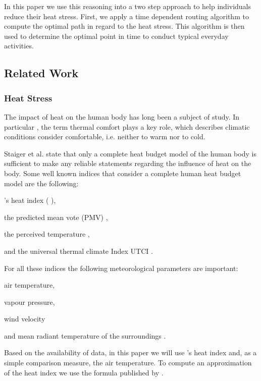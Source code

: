 In this paper we use this reasoning into a two step approach to help individuals reduce their heat stress. First, we apply a time dependent routing algorithm to compute the optimal path in regard to the heat stress. This algorithm is then used to determine the optimal point in time to conduct typical everyday activities. 



   
\subsection{Related Work} 

\subsubsection{Heat Stress}
The impact of heat on the human body has long been a subject of study. In particular , the term thermal comfort plays a key role, which describes climatic conditions consider comfortable, i.e. neither to warm nor to cold. 

Staiger et al. \parencite{Staiger1997} state that only a complete heat budget model of the human body is sufficient to make any reliable statements regarding the influence of heat on the body. Some well known indices that consider a complete human heat budget model are the following:
\begin{inparaenum}[(1)]
  \item \citeauthor{Steadman1979}'s heat index (\citeauthor{Steadman1979} \citeyear*{Steadman1979}\citeyear*{Steadman1979a}),
  \item the predicted mean vote (PMV) \parencite{Fanger1973},
  \item the perceived temperature \parencite{Staiger1997,Jendritzky2000},
  \item and the universal thermal climate Index UTCI \parencite{Jendritzky2010}.
\end{inparaenum}

For all these indices the following meteorological parameters are important:
\begin{inparaenum}[(1)]
\item air temperature,
\item vapour pressure,
\item wind velocity 
\item and mean radiant temperature of the surroundings \parencite{Matzarakis1999}.
\end{inparaenum}

Based on the availability of data, in this paper we will use \citeauthor{Steadman1979}'s heat index \parencite{Steadman1979} and, as a simple comparison measure, the air temperature. To compute an approximation of the heat index we use the formula published by \textcite[77]{Stull2011}.  

